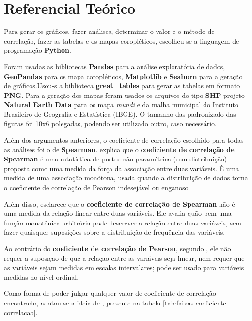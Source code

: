\chapter{Referencial Teórico}

Para gerar os gráficos, fazer análises, determinar o valor e o método de correlação, fazer as tabelas e os mapas coropléticos, escolheu-se a linguagem de programação \textbf{Python}.

Foram usadas as bibliotecas \textbf{Pandas} para a análise exploratória de dados, \textbf{GeoPandas} para os mapa coropléticos, \textbf{Matplotlib} e \textbf{Seaborn} para a geração  de gráficos.Usou-s a biblioteca \textbf{great\_tables} para gerar as tabelas em formato \textbf{PNG}. Para a geração dos mapas foram usados os arquivos do tipo \textbf{SHP} projeto \textbf{Natural Earth Data} para os mapa \textit{mundi} e da malha municipal do Instituto Brasileiro de Geografia e Estatística (IBGE). O tamanho das padronizado das figuras foi 10x6 polegadas, podendo ser utilizado outro, caso necessário.

Além dos argumentos anteriores, o coeficiente de correlação escolhido para todas as análises foi o de \textbf{Spearman}. \cite{hauke2011comparison} explica que o \textbf{coeficiente de correlação de Spearman} é uma estatística de postos não paramétrica (sem distribuição) proposta como uma medida da força da associação entre duas variáveis. É uma medida de uma associação monótona, usada quando a distribuição de dados torna o coeficiente de correlação de Pearson indesejável ou enganoso. 

Além disso, \cite{hauke2011comparison} esclarece que o \textbf{coeficiente de correlação de Spearman} não é uma medida da relação linear entre duas variáveis. Ele avalia quão bem uma função monotônica arbitrária pode descrever a relação entre duas variáveis, sem fazer quaisquer suposições sobre a distribuição de frequência das variáveis.

Ao contrário do \textbf{coeficiente de correlação de Pearson}, segundo \cite{hauke2011comparison}, ele não requer a suposição de que a relação entre as variáveis seja linear, nem requer que as variáveis sejam medidas em escalas intervalares; pode ser usado para variáveis medidas no nível ordinal.

Como forma de poder julgar qualquer valor de coeficiente de correlação encontrado, adotou-se a ideia de \cite{ali2022spearman}, presente na tabela \ref{tab:faixas-coeficiente-correlacao}.


